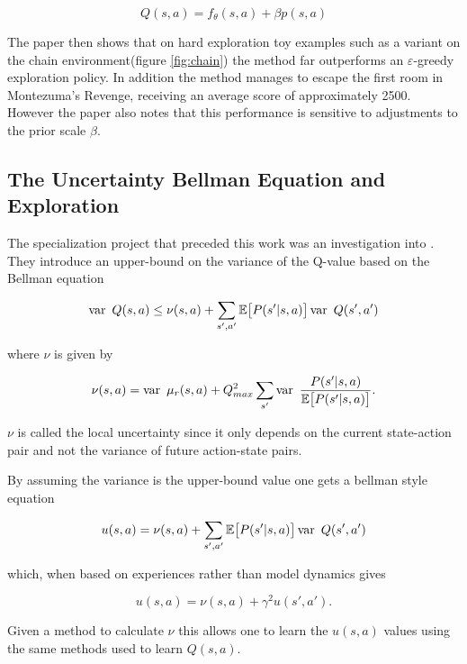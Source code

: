 \begin{equation}
    Q(s,a) = f_\theta(s,a) + \beta p(s,a)
\end{equation}

The paper then shows that on hard exploration toy examples such as a variant on the chain environment(figure \ref{fig:chain}) the method far outperforms an $\varepsilon$-greedy exploration policy. In addition the method manages to escape the first room in Montezuma's Revenge, receiving an average score of approximately 2500. However the paper also notes that this performance is sensitive to adjustments to the prior scale $\beta$.

\subsection{The Uncertainty Bellman Equation and Exploration}

The specialization project that preceded this work was an investigation into \cite{donoghue_2017}. They introduce an upper-bound on the variance of the Q-value based on the Bellman equation

\begin{equation}
    \var Q(s,a) \le \nu(s,a) + \sum_{s',a'}\mathbb{E}\big[P(s'|s,a)\big]\var Q(s',a')
\end{equation}

where $\nu$ is given by

\begin{equation}
    \nu(s,a) = \var \mu_r(s,a) + Q_{max}^2 \sum_{s'} \var \frac{P(s'|s,a)}{\mathbb{E}\big[P(s'|s,a)\big]}.
\end{equation}

$\nu$ is called the local uncertainty since it only depends on the current state-action pair and not the variance of future action-state pairs.

By assuming the variance is the upper-bound value \cite{donoghue_2017} one gets a bellman style equation

\begin{equation}
    u(s,a) = \nu(s,a) + \sum_{s',a'}\mathbb{E}\big[P(s'|s,a)\big]\var Q(s',a')
\end{equation}

which, when based on experiences rather than model dynamics gives

\begin{equation}
    u(s,a) = \nu(s,a) + \gamma^2 u(s',a').
\end{equation}

Given a method to calculate $\nu$ this allows one to learn the $u(s,a)$ values using the same methods used to learn $Q(s,a)$.

